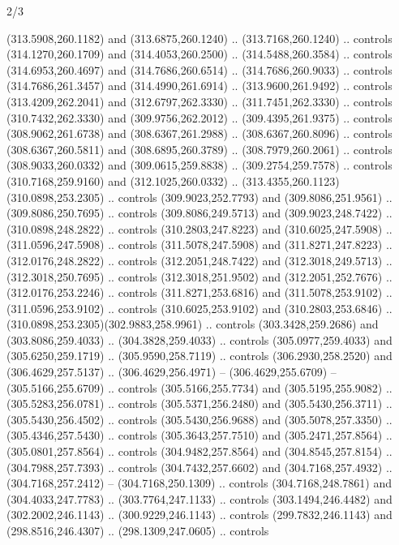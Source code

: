 \begin{flagdescription}{2/3}
\begin{scope}[xshift=0.5\flaglength,yshift=0.5\flagwidth,scale=\flagwidth/235.81]
\begin{scope}[y=0.8pt, x=0.8pt, yscale=-1,shift={(-239.08,-147.38)}]
    (313.5908,260.1182) and (313.6875,260.1240) .. (313.7168,260.1240) .. controls
    (314.1270,260.1709) and (314.4053,260.2500) .. (314.5488,260.3584) .. controls
    (314.6953,260.4697) and (314.7686,260.6514) .. (314.7686,260.9033) .. controls
    (314.7686,261.3457) and (314.4990,261.6914) .. (313.9600,261.9492) .. controls
    (313.4209,262.2041) and (312.6797,262.3330) .. (311.7451,262.3330) .. controls
    (310.7432,262.3330) and (309.9756,262.2012) .. (309.4395,261.9375) .. controls
    (308.9062,261.6738) and (308.6367,261.2988) .. (308.6367,260.8096) .. controls
    (308.6367,260.5811) and (308.6895,260.3789) .. (308.7979,260.2061) .. controls
    (308.9033,260.0332) and (309.0615,259.8838) .. (309.2754,259.7578) .. controls
    (310.7168,259.9160) and (312.1025,260.0332) ..
    (313.4355,260.1123)(310.0898,253.2305) .. controls (309.9023,252.7793) and
    (309.8086,251.9561) .. (309.8086,250.7695) .. controls (309.8086,249.5713) and
    (309.9023,248.7422) .. (310.0898,248.2822) .. controls (310.2803,247.8223) and
    (310.6025,247.5908) .. (311.0596,247.5908) .. controls (311.5078,247.5908) and
    (311.8271,247.8223) .. (312.0176,248.2822) .. controls (312.2051,248.7422) and
    (312.3018,249.5713) .. (312.3018,250.7695) .. controls (312.3018,251.9502) and
    (312.2051,252.7676) .. (312.0176,253.2246) .. controls (311.8271,253.6816) and
    (311.5078,253.9102) .. (311.0596,253.9102) .. controls (310.6025,253.9102) and
    (310.2803,253.6846) .. (310.0898,253.2305)(302.9883,258.9961) .. controls
    (303.3428,259.2686) and (303.8086,259.4033) .. (304.3828,259.4033) .. controls
    (305.0977,259.4033) and (305.6250,259.1719) .. (305.9590,258.7119) .. controls
    (306.2930,258.2520) and (306.4629,257.5137) .. (306.4629,256.4971) --
    (306.4629,255.6709) -- (305.5166,255.6709) .. controls (305.5166,255.7734) and
    (305.5195,255.9082) .. (305.5283,256.0781) .. controls (305.5371,256.2480) and
    (305.5430,256.3711) .. (305.5430,256.4502) .. controls (305.5430,256.9688) and
    (305.5078,257.3350) .. (305.4346,257.5430) .. controls (305.3643,257.7510) and
    (305.2471,257.8564) .. (305.0801,257.8564) .. controls (304.9482,257.8564) and
    (304.8545,257.8154) .. (304.7988,257.7393) .. controls (304.7432,257.6602) and
    (304.7168,257.4932) .. (304.7168,257.2412) -- (304.7168,250.1309) .. controls
    (304.7168,248.7861) and (304.4033,247.7783) .. (303.7764,247.1133) .. controls
    (303.1494,246.4482) and (302.2002,246.1143) .. (300.9229,246.1143) .. controls
    (299.7832,246.1143) and (298.8516,246.4307) .. (298.1309,247.0605) .. controls

\end{scope}
\end{scope}
\end{flagdescription}
